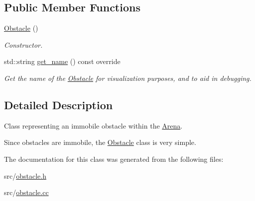 \subsection*{Public Member Functions}
\begin{DoxyCompactItemize}
\item 
\hyperlink{classObstacle_a8f734072321fa06a7b7dae2d5f50f352}{Obstacle} ()\hypertarget{classObstacle_a8f734072321fa06a7b7dae2d5f50f352}{}\label{classObstacle_a8f734072321fa06a7b7dae2d5f50f352}

\begin{DoxyCompactList}\small\item\em Constructor. \end{DoxyCompactList}\item 
std\+::string \hyperlink{classObstacle_a4642d3f61b6e74fd5a9c91bb263dfe18}{get\+\_\+name} () const override\hypertarget{classObstacle_a4642d3f61b6e74fd5a9c91bb263dfe18}{}\label{classObstacle_a4642d3f61b6e74fd5a9c91bb263dfe18}

\begin{DoxyCompactList}\small\item\em Get the name of the \hyperlink{classObstacle}{Obstacle} for visualization purposes, and to aid in debugging. \end{DoxyCompactList}\end{DoxyCompactItemize}


\subsection{Detailed Description}
Class representing an immobile obstacle within the \hyperlink{classArena}{Arena}. 

Since obstacles are immobile, the \hyperlink{classObstacle}{Obstacle} class is very simple. 

The documentation for this class was generated from the following files\+:\begin{DoxyCompactItemize}
\item 
src/\hyperlink{obstacle_8h}{obstacle.\+h}\item 
src/\hyperlink{obstacle_8cc}{obstacle.\+cc}\end{DoxyCompactItemize}
